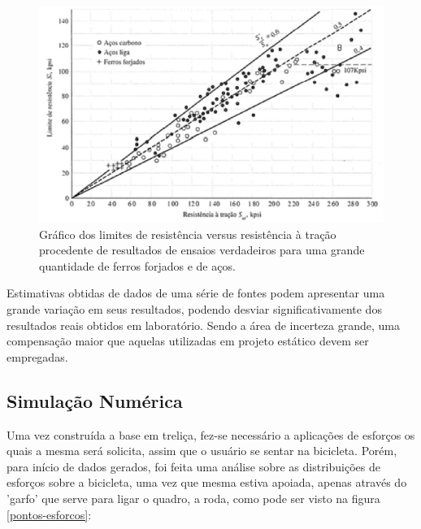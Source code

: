 \begin{figure}[h]
\centering
\includegraphics[scale=0.6]{figuras/resistencia_tracao.png}
\caption{Gráfico dos limites de resistência versus resistência à tração procedente de resultados de ensaios verdadeiros para uma grande quantidade de ferros forjados e de aços.}
\label{grafico-limites}
\end{figure}

Estimativas obtidas de dados de uma série de fontes podem apresentar uma grande variação em seus resultados, podendo desviar significativamente dos resultados reais obtidos em laboratório. Sendo a área de incerteza grande, uma compensação maior que aquelas utilizadas em projeto estático devem ser empregadas.

\subsection{Simulação Numérica}

Uma vez construída a base em treliça, fez-se necessário a aplicações de esforços os quais a mesma será solicita, assim que o usuário se sentar na bicicleta. Porém, para início de dados gerados, foi feita uma análise sobre as distribuições de esforços sobre a bicicleta, uma vez que mesma estiva apoiada, apenas através do 'garfo' que serve para ligar o quadro, a roda, como pode ser visto na figura \ref{pontos-esforcos}:

